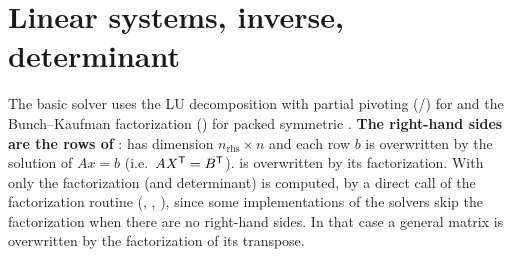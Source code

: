 \section{Linear systems, inverse, determinant}\label{sec:nonclass:linsolve}
The basic solver uses the LU decomposition with partial pivoting (/) for
 and the Bunch--Kaufman factorization () for packed symmetric .
\textbf{The right-hand sides are the rows of }:  has dimension $n_{\mathrm{rhs}}\times n$ and
each row $b$ is overwritten by the solution of $A x=b$ (i.e.\ $A X^{\mathsf T}=B^{\mathsf T}$).  is overwritten
by its factorization. With  only the factorization (and determinant) is computed, by a direct call of the
factorization routine (, , ), since some implementations of the solvers skip the
factorization when there are no right-hand sides. In that case a general matrix is overwritten by the factorization of its transpose.

